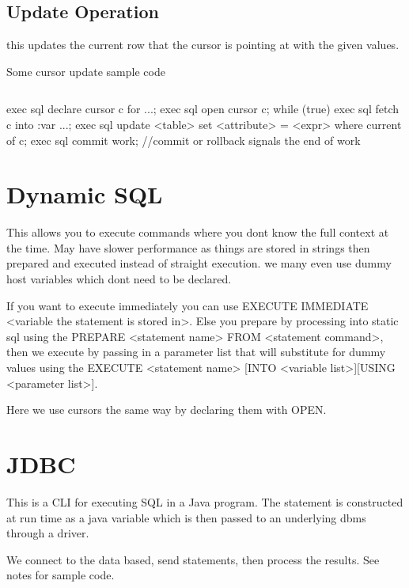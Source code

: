 \documentclass{article}
\begin{document}

\subsection*{Update Operation} %
\label{sec:update_operation}
this updates the current row that the cursor is pointing at with the given values.

Some cursor update sample code
\begin{verbatim}

\end{verbatim}
exec sql declare cursor c for ...;
exec sql open cursor c;
while (true){
    exec sql fetch c into :var ...;
    exec sql update <table> set <attribute> = <expr>
    where current of c;
    exec sql commit work;} //commit or rollback signals the end of work

\section{Dynamic SQL} %
\label{sec:dynamic_sql}
This allows you to execute commands where you dont know the full context at the time. May have slower performance as things are stored in strings then prepared and executed instead of straight execution. we many even use dummy host variables which dont need to be declared.

If you want to execute immediately you can use EXECUTE IMMEDIATE <variable the statement is stored in>. Else you prepare by processing into static sql using the PREPARE <statement name> FROM <statement command>, then we execute by passing in a parameter list that will substitute for dummy values using the EXECUTE <statement name> [INTO <variable list>][USING <parameter list>].


Here we use cursors the same way by declaring them with OPEN.

\section{JDBC} %
\label{sec:jdbc}
This is a CLI for executing SQL in a Java program. The statement is constructed at run time as a java variable which is then passed to an underlying dbms through a driver.

We connect to the data based, send statements, then process the results. See notes for sample code.
\end{document}
